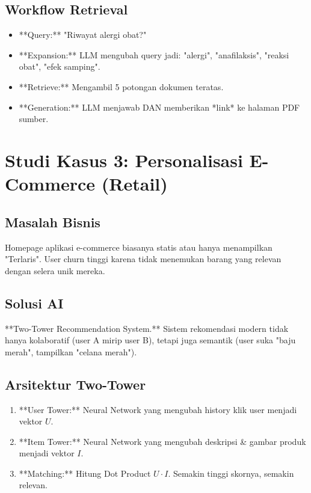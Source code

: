 \subsection{Workflow Retrieval}
\begin{itemize}
    \item **Query:** "Riwayat alergi obat?"
    \item **Expansion:** LLM mengubah query jadi: "alergi", "anafilaksis", "reaksi obat", "efek samping".
    \item **Retrieve:** Mengambil 5 potongan dokumen teratas.
    \item **Generation:** LLM menjawab DAN memberikan *link* ke halaman PDF sumber.
\end{itemize}

\section{Studi Kasus 3: Personalisasi E-Commerce (Retail)}

\subsection{Masalah Bisnis}
Homepage aplikasi e-commerce biasanya statis atau hanya menampilkan "Terlaris". User churn tinggi karena tidak menemukan barang yang relevan dengan selera unik mereka.

\subsection{Solusi AI}
**Two-Tower Recommendation System.**
Sistem rekomendasi modern tidak hanya kolaboratif (user A mirip user B), tetapi juga semantik (user suka "baju merah", tampilkan "celana merah").

\subsection{Arsitektur Two-Tower}
\begin{enumerate}
    \item **User Tower:** Neural Network yang mengubah history klik user menjadi vektor $U$.
    \item **Item Tower:** Neural Network yang mengubah deskripsi \& gambar produk menjadi vektor $I$.
    \item **Matching:** Hitung Dot Product $U \cdot I$. Semakin tinggi skornya, semakin relevan.
\end{enumerate}

